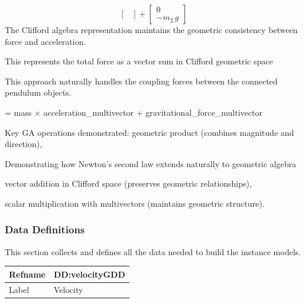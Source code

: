 \documentclass[12pt]{article}
\begin{document}
{\begin{displaymath}
{\begin{bmatrix}
                                                                                                                                                          \end{bmatrix}+\begin{bmatrix}
                                                                                                                                                                        0\\
                                                                                                                                                                        -{m_{2}}\,g
                                                                                                                                                                        \end{bmatrix}}
\end{displaymath}
The Clifford algebra representation maintains the geometric consistency between force and acceleration.

This represents the total force as a vector sum in Clifford geometric space

This approach naturally handles the coupling forces between the connected pendulum objects.

= mass × acceleration\_multivector + gravitational\_force\_multivector

Key GA operations demonstrated: geometric product (combines magnitude and direction),

Demonstrating how Newton's second law extends naturally to geometric algebra

vector addition in Clifford space (preserves geometric relationships),

scalar multiplication with multivectors (maintains geometric structure).

\subsubsection{Data Definitions}
\label{Sec:DDs}
This section collects and defines all the data needed to build the instance models.

\medskip
\noindent
\begin{minipage}{\textwidth}
\begin{tabular}{>{\raggedright}p{}>{\raggedright\arraybackslash}p{}}
\toprule \textbf{Refname} & \textbf{DD:velocityGDD}
\label{DD:velocityGDD}
\\ \midrule
Label & Velocity
        

\end{tabular}
\end{minipage}}
\end{document}
